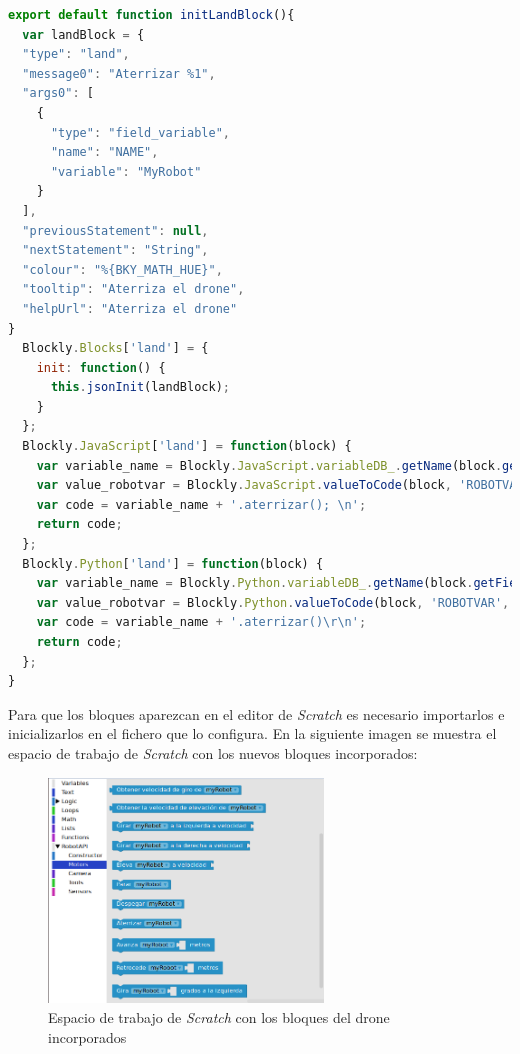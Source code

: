 \begin{lstlisting}[language=javascript,label=lst:tradAterrizar,basicstyle=\tiny]
export default function initLandBlock(){
  var landBlock = {
  "type": "land",
  "message0": "Aterrizar %1",
  "args0": [
    {
      "type": "field_variable",
      "name": "NAME",
      "variable": "MyRobot"
    }
  ],
  "previousStatement": null,
  "nextStatement": "String",
  "colour": "%{BKY_MATH_HUE}",
  "tooltip": "Aterriza el drone",
  "helpUrl": "Aterriza el drone"
}
  Blockly.Blocks['land'] = {
    init: function() {
      this.jsonInit(landBlock);
    }
  };
  Blockly.JavaScript['land'] = function(block) {
    var variable_name = Blockly.JavaScript.variableDB_.getName(block.getFieldValue('NAME'), Blockly.Variables.NAME_TYPE);
    var value_robotvar = Blockly.JavaScript.valueToCode(block, 'ROBOTVAR', Blockly.JavaScript.ORDER_ATOMIC);
    var code = variable_name + '.aterrizar(); \n';
    return code;
  };
  Blockly.Python['land'] = function(block) {
    var variable_name = Blockly.Python.variableDB_.getName(block.getFieldValue('NAME'), Blockly.Variables.NAME_TYPE);
    var value_robotvar = Blockly.Python.valueToCode(block, 'ROBOTVAR', Blockly.Python.ORDER_ATOMIC);
    var code = variable_name + '.aterrizar()\r\n';
    return code;
  };
}
\end{lstlisting}

Para que los bloques aparezcan en el editor de \textit{Scratch} es necesario importarlos e inicializarlos en el fichero que lo configura. En la siguiente imagen se muestra el espacio de trabajo de \textit{Scratch} con los nuevos bloques incorporados:

\begin{figure}[H]
    \centering            \includegraphics[width=0.65\textwidth]{img/kibotics_newblocks.png}
    \caption{Espacio de trabajo de \textit{Scratch} con los bloques del drone incorporados} 
    \label{fig:newblocks}
\end{figure}

